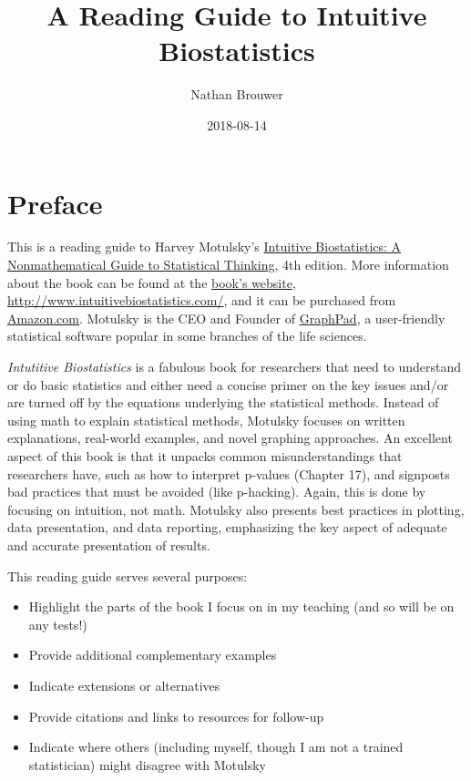 \documentclass[]{book}
\title{A Reading Guide to Intuitive Biostatistics}
\author{Nathan Brouwer}
\date{2018-08-14}
\providecommand{\tightlist}{%
  \setlength{\itemsep}{0pt}\setlength{\parskip}{0pt}}
\theoremstyle{definition}
\theoremstyle{definition}
\theoremstyle{definition}
\theoremstyle{remark}
\begin{document}
\maketitle

{
\setcounter{tocdepth}{1}
\tableofcontents
}
\chapter*{Preface}\label{preface}

This is a reading guide to Harvey Motulsky's
\href{http://www.intuitivebiostatistics.com/}{Intuitive Biostatistics: A
Nonmathematical Guide to Statistical Thinking}, 4th edition. More
information about the book can be found at the
\href{http://www.intuitivebiostatistics.com/}{book's website},
\url{http://www.intuitivebiostatistics.com/}, and it can be purchased
from
\href{https://www.amazon.com/Intuitive-Biostatistics-Nonmathematical-Statistical-Thinking/dp/0190643560/ref=asap_bc?ie=UTF8}{Amazon.com}.
Motulsky is the CEO and Founder of
\href{https://www.graphpad.com/}{GraphPad}, a user-friendly statistical
software popular in some branches of the life sciences.

\emph{Intutitive Biostatistics} is a fabulous book for researchers that
need to understand or do basic statistics and either need a concise
primer on the key issues and/or are turned off by the equations
underlying the statistical methods. Instead of using math to explain
statistical methods, Motulsky focuses on written explanations,
real-world examples, and novel graphing approaches. An excellent aspect
of this book is that it unpacks common misunderstandings that
researchers have, such as how to interpret p-values (Chapter 17), and
signposts bad practices that must be avoided (like p-hacking). Again,
this is done by focusing on intuition, not math. Motulsky also presents
best practices in plotting, data presentation, and data reporting,
emphasizing the key aspect of adequate and accurate presentation of
results.

This reading guide serves several purposes:

\begin{itemize}
\tightlist
\item
  Highlight the parts of the book I focus on in my teaching (and so will
  be on any tests!)
\item
  Provide additional complementary examples
\item
  Indicate extensions or alternatives
\item
  Provide citations and links to resources for follow-up
\item
  Indicate where others (including myself, though I am not a trained
  statistician) might disagree with Motulsky
\end{itemize}
\end{document}
